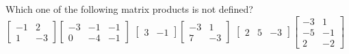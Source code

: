 \begin{activity}
Which one of the following matrix products is not defined?
{\(\begin{bmatrix} -1&2
\\1&-3 \end{bmatrix}\begin{bmatrix} -3&-1&-1
\\0&-4&-1 \end{bmatrix}\)}
{\(\begin{bmatrix} 3&-1 \end{bmatrix}\begin{bmatrix} -3&1
\\7&-3 \end{bmatrix}\)}
{\(\begin{bmatrix} 2&5&-3 \end{bmatrix}\begin{bmatrix} -3&1
\\-5&-1
\\2&-2 \end{bmatrix}\)}
\end{activity}




